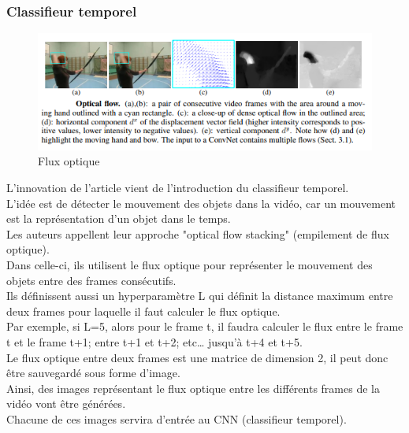 \documentclass[11pt]{article}
\begin{document}
\subsubsection{Classifieur temporel}
\label{sec:orgac7e7cf}
\begin{figure}[htbp]
\centering
\includegraphics[width=12cm]{optical_flow.png}
\caption{Flux optique \label{optical-flow} \label{opt-flow}}
\end{figure}
L'innovation de l'article vient de l'introduction du classifieur temporel.\\

L'idée est de détecter le mouvement des objets dans la vidéo, car un mouvement est la représentation d'un objet dans le temps.\\
Les auteurs appellent leur approche "optical flow stacking" (empilement de flux optique).\\

Dans celle-ci, ils utilisent le flux optique pour représenter le mouvement des objets entre des frames consécutifs.\\

Ils définissent aussi un hyperparamètre L qui définit la distance maximum entre deux frames pour laquelle il faut calculer le flux optique.\\
Par exemple, si L=5, alors pour le frame t, il faudra calculer le flux entre le frame t et le frame t+1; entre t+1 et t+2; etc\ldots{} jusqu'à t+4 et t+5.\\
Le flux optique entre deux frames est une matrice de dimension 2, il peut donc être sauvegardé sous forme d'image.\\
Ainsi, des images représentant le flux optique entre les différents frames de la vidéo vont être générées.\\

Chacune de ces images servira d'entrée au CNN (classifieur temporel).\\
\end{document}
